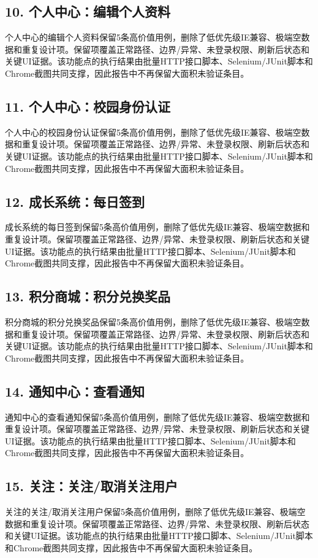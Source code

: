 \documentclass[UTF8,zihao=-4]{ctexart}
\begin{document}
\subsection{10. 个人中心：编辑个人资料}
个人中心的编辑个人资料保留5条高价值用例，删除了低优先级IE兼容、极端空数据和重复设计项。保留项覆盖正常路径、边界/异常、未登录权限、刷新后状态和关键UI证据。该功能点的执行结果由批量HTTP接口脚本、Selenium/JUnit脚本和Chrome截图共同支撑，因此报告中不再保留大面积未验证条目。

\subsection{11. 个人中心：校园身份认证}
个人中心的校园身份认证保留5条高价值用例，删除了低优先级IE兼容、极端空数据和重复设计项。保留项覆盖正常路径、边界/异常、未登录权限、刷新后状态和关键UI证据。该功能点的执行结果由批量HTTP接口脚本、Selenium/JUnit脚本和Chrome截图共同支撑，因此报告中不再保留大面积未验证条目。

\subsection{12. 成长系统：每日签到}
成长系统的每日签到保留5条高价值用例，删除了低优先级IE兼容、极端空数据和重复设计项。保留项覆盖正常路径、边界/异常、未登录权限、刷新后状态和关键UI证据。该功能点的执行结果由批量HTTP接口脚本、Selenium/JUnit脚本和Chrome截图共同支撑，因此报告中不再保留大面积未验证条目。

\subsection{13. 积分商城：积分兑换奖品}
积分商城的积分兑换奖品保留5条高价值用例，删除了低优先级IE兼容、极端空数据和重复设计项。保留项覆盖正常路径、边界/异常、未登录权限、刷新后状态和关键UI证据。该功能点的执行结果由批量HTTP接口脚本、Selenium/JUnit脚本和Chrome截图共同支撑，因此报告中不再保留大面积未验证条目。

\subsection{14. 通知中心：查看通知}
通知中心的查看通知保留5条高价值用例，删除了低优先级IE兼容、极端空数据和重复设计项。保留项覆盖正常路径、边界/异常、未登录权限、刷新后状态和关键UI证据。该功能点的执行结果由批量HTTP接口脚本、Selenium/JUnit脚本和Chrome截图共同支撑，因此报告中不再保留大面积未验证条目。

\subsection{15. 关注：关注/取消关注用户}
关注的关注/取消关注用户保留5条高价值用例，删除了低优先级IE兼容、极端空数据和重复设计项。保留项覆盖正常路径、边界/异常、未登录权限、刷新后状态和关键UI证据。该功能点的执行结果由批量HTTP接口脚本、Selenium/JUnit脚本和Chrome截图共同支撑，因此报告中不再保留大面积未验证条目。
\end{document}
